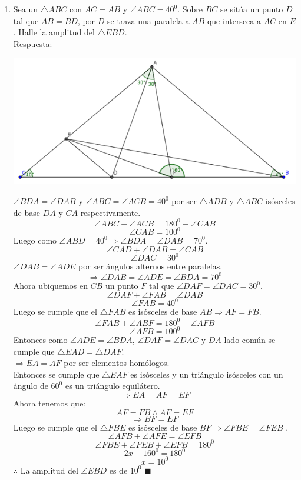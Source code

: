 \documentclass{book}
\begin{document}
\begin{enumerate}
				\item Sea un $\triangle ABC$ con $AC=AB$ y $\angle ABC = 40^0$. Sobre $BC$ se sitúa un punto $D$ tal que $AB=BD$, por $D$ se traza una paralela a $AB$ que interseca a $AC$ en $E$. Halle la amplitud del $\triangle EBD$.\\
					Respuesta:
					\begin{center}
						\includegraphics[scale=1]{imagenes/Geometria/7.png}
					\end{center}
					$\angle BDA=\angle DAB$  y $\angle ABC=\angle ACB=40^0$  por ser $\triangle ADB$ y $\triangle ABC$ isósceles de base $DA$ y $CA$ respectivamente. 
$$\angle ABC+\angle ACB=180^0-\angle CAB$$
$$\angle CAB=100^0$$
Luego como $\angle ABD=40^0\Rightarrow\angle BDA=\angle DAB=70^0$.
$$\angle CAD+\angle DAB=\angle CAB$$
$$\angle DAC=30^0$$
$\angle DAB=\angle ADE$ por ser ángulos alternos entre paralelas.
$$\Rightarrow\angle DAB=\angle ADE=\angle BDA=70^0$$
Ahora ubiquemos en $CB$ un punto $F$ tal que $\angle DAF=\angle DAC=30^0$.
$$\angle DAF+\angle FAB=\angle DAB$$
$$\angle FAB=40^0$$
Luego se cumple que el $\triangle FAB$ es isósceles de base $AB  \Rightarrow  AF=FB$.
$$\angle FAB+\angle ABF=180^0-\angle AFB$$
$$\angle AFB=100^0$$
Entonces como $\angle ADE=\angle BDA$, $\angle DAF=\angle DAC$ y $DA$ lado común se cumple que $\triangle EAD=\triangle DAF$. \\ 
$\Rightarrow  EA=AF$ por ser elementos homólogos.\\
Entonces se cumple que $\triangle EAF$ es isósceles y un triángulo isósceles con un ángulo de $60^0$ es un triángulo equilátero.
$$\Rightarrow  EA=AF=EF$$
Ahora tenemos que:
$$AF=FB \wedge AF=EF$$
$$\Rightarrow  BF=EF$$
Luego se cumple que el $\triangle FBE$ es isósceles de base $BF  \Rightarrow \angle FBE=\angle FEB$ .
$$\angle AFB+\angle AFE=\angle EFB$$
$$\angle FBE+\angle FEB+\angle EFB=180^0$$
$$2x+160^0=180^0$$
$$x=10^0$$
$\therefore$ La amplitud del $\angle EBD$ es de $10^0$ $\blacksquare$\\

\end{enumerate}
\end{document}
